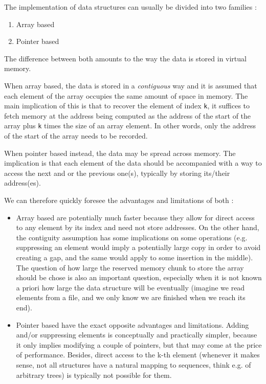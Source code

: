 \documentclass[12pt]{article}
\theoremstyle{plain}
\theoremstyle{remark}
\begin{document}
The implementation of data structures can usually be divided into two families : 
\begin{enumerate}
	\item Array based
	\item Pointer based
\end{enumerate}

The difference between both amounts to the way the data is stored in virtual
memory. 

When array based, the data is stored in a {\it contiguous} way and it is
assumed that each element of the array occupies the same amount of space in
memory. The main implication of this is that to recover the element of index
{\tt k}, it suffices to fetch memory at the address being computed as the address
of the start of the array plus {\tt k} times the size of an array element. In
other words, only the address of the start of the array needs to be recorded. 

When pointer based instead, the data may be spread across memory. The implication is
that each element of the data should be accompanied with a way to access the
next and or the previous one(s), typically by storing its/their address(es).

We can therefore quickly foresee the advantages and limitations of both : 

\begin{itemize}
	\item Array based are potentially much faster because they allow for
		direct access to any element by its index and need not store 
		addresses. On the other hand,
		the contiguity assumption has some implications on some
		operations (e.g. suppressing an element would imply a
		potentially large copy in order to avoid creating a gap, and the
		same would apply to some insertion in the middle). The
		question of how large the reserved memory chunk to store the
		array should be chose is also an important question, especially
		when it is not known a priori how large the data structure will
		be eventually (imagine we read elements from a file, and we only
		know we are finished when we reach its end).
	\item Pointer based have the exact opposite advantages and limitations. 
		Adding and/or suppressing elements is conceptually and
		practically simpler, because it only implies modifying a
		couple of pointers, but that may come at the price of
		performance. Besides, direct access to the k-th element 
		(whenever it makes sense, not all structures have a natural
		mapping to sequences, think e.g. of arbitrary trees) 
		is typically not possible for them.
\end{itemize}
\end{document}
